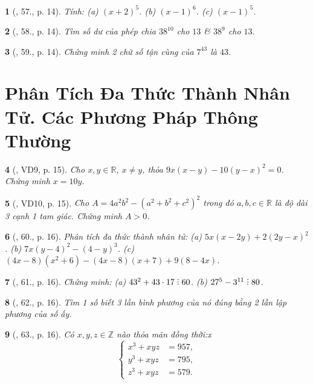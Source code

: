 \documentclass{article}
\newtheorem{baitoan}{}
\DeclareRobustCommand{\divby}{%
	\mathrel{\vbox{\baselineskip.65ex\lineskiplimit0pt\hbox{.}\hbox{.}\hbox{.}}}%
}
\begin{document}
\begin{baitoan}[\cite{Tuyen_Toan_8}, 57., p. 14]
	Tính: (a) $(x + 2)^5$. (b) $(x - 1)^6$. (c) $(x - 1)^5$.
\end{baitoan}

\begin{baitoan}[\cite{Tuyen_Toan_8}, 58., p. 14]
	Tìm số dư của phép chia $38^{10}$ cho $13$ \& $38^9$ cho $13$.
\end{baitoan}

\begin{baitoan}[\cite{Tuyen_Toan_8}, 59., p. 14]
	Chứng minh 2 chữ số tận cùng của $7^{43}$ là $43$.
\end{baitoan}


\section{Phân Tích Đa Thức Thành Nhân Tử. Các Phương Pháp Thông Thường}

\begin{baitoan}[\cite{Tuyen_Toan_8}, VD9, p. 15]
	Cho $x,y\in\mathbb{R}$, $x\ne y$, thỏa $9x(x - y) - 10(y - x)^2 = 0$. Chứng minh $x = 10y$.
\end{baitoan}

\begin{baitoan}[\cite{Tuyen_Toan_8}, VD10, p. 15]
	Cho $A = 4a^2b^2 - (a^2 + b^2 + c^2)^2$ trong đó $a,b,c\in\mathbb{R}$ là độ dài 3 cạnh 1 tam giác. Chứng minh $A > 0$.
\end{baitoan}

\begin{baitoan}[\cite{Tuyen_Toan_8}, 60., p. 16]
	Phân tích đa thức thành nhân tử: (a) $5x(x - 2y) + 2(2y - x)^2$. (b) $7x(y - 4)^2 - (4 - y)^3$. (c) $(4x - 8)(x^2 + 6) - (4x - 8)(x + 7) + 9(8 - 4x)$.
\end{baitoan}

\begin{baitoan}[\cite{Tuyen_Toan_8}, 61., p. 16]
	Chứng minh: (a) $43^2 + 43\cdot17\divby60$. (b) $27^5 - 3^{11}\divby80$.
\end{baitoan}

\begin{baitoan}[\cite{Tuyen_Toan_8}, 62., p. 16]
	Tìm 1 số biết 3 lần bình phương của nó đúng bằng 2 lần lập phương của số ấy.
\end{baitoan}

\begin{baitoan}[\cite{Tuyen_Toan_8}, 63., p. 16]
	Có $x,y,z\in\mathbb{Z}$ nào thỏa mãn đồng thời:x
	\begin{equation*}
		\left\{\begin{split}
			x^3 + xyz &= 957,\\
			y^3 + xyz &= 795,\\
			z^3 + xyz &= 579.
		\end{split}\right.
	\end{equation*}
\end{baitoan}
\end{document}
